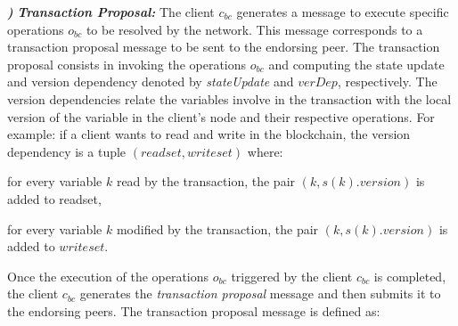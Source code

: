 \documentclass[conference]{llncs}
\newcounter{paranum}
\newcommand{\Par}{\vspace{10pt}\noindent\textbf{\refstepcounter{paranum}\theparanum}\textbf\textit) }
\begin{document}
\Par{\textit{\textbf{Transaction Proposal:}}}
The client $c_{bc}$ generates a message to execute specific operations $o_{bc}$ to be resolved by the network. This message corresponds to a transaction proposal message to be sent to the endorsing peer. The transaction proposal consists in invoking the operations $o_{bc}$ and computing the state update and version dependency denoted by \textit{stateUpdate} and $\textit{verDep}$, respectively. The version dependencies relate the variables involve in the transaction with the local version of the variable in the client's node and their respective operations. For example: if a client wants to read and write in the blockchain, the version dependency is a tuple $\left(readset,writeset\right)$ where:

\begin{compactitem}
\item for every variable $k$ read by the transaction, the pair $(k,s(k).version)$ is added to readset,
\item for every variable $k$ modified by the transaction, the pair $(k,s(k).version)$ is added to $writeset$.
\end{compactitem}

Once the execution of the operations $o_{bc}$ triggered by the client $c_{bc}$ is completed, the client $c_{bc}$ generates the \textit{transaction proposal} message and then submits it to the endorsing peers. The transaction proposal message is defined as:

\noindent{}
\end{document}
